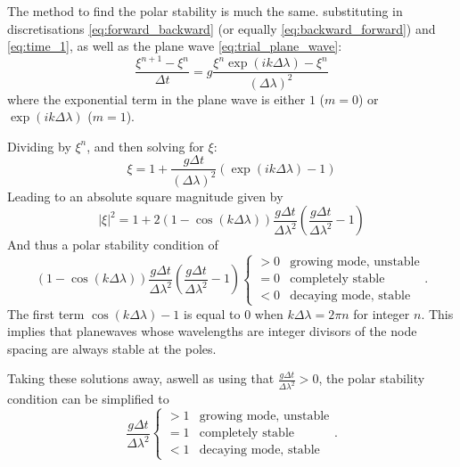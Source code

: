 \documentclass[12pt, onecolumn]{revtex4-2}    %
\begin{document}
The method to find the polar stability is much the same.
substituting in discretisations \eqref{eq:forward_backward} (or equally \eqref{eq:backward_forward}) and \eqref{eq:time_1}, as well as the plane wave \eqref{eq:trial_plane_wave}:
\begin{equation*}
    \frac{\xi^{n+1} - \xi^{n}}{\Delta t} = g\frac{\xi^n \exp(i k \Delta\lambda) - \xi^n}{(\Delta\lambda)^2}
\end{equation*}
where the exponential term in the plane wave is either $1$ ($m=0$) or $\exp(i k \Delta\lambda)$ ($m=1$).

Dividing by $\xi^n$, and then solving for $\xi$:
\begin{equation*}
    \xi = 1 + \frac{g\Delta t}{(\Delta \lambda)^2}\left(\exp(i k \Delta \lambda) - 1\right)
\end{equation*}
Leading to an absolute square magnitude given by
\begin{equation*}
    |\xi|^2 = 1 + 2 (1-\cos(k\Delta\lambda)) \frac{g \Delta t}{\Delta \lambda ^2}\left(\frac{g\Delta t}{\Delta \lambda ^2} - 1\right)
\end{equation*}
And thus a polar stability condition of
\begin{equation*}
    (1-\cos(k\Delta\lambda)) \frac{g \Delta t}{\Delta \lambda ^2}\left(\frac{g\Delta t}{\Delta \lambda ^2} - 1\right)
    \begin{cases}
        > 0 & \text{growing mode, unstable} \\
        = 0 & \text{completely stable}      \\
        < 0 & \text{decaying mode, stable}
    \end{cases}
    .
\end{equation*}
The first term $\cos(k\Delta\lambda) - 1$ is equal to $0$ when $k\Delta\lambda = 2\pi n$ for integer $n$.
This implies that planewaves whose wavelengths are integer divisors of the node spacing are always stable at the poles.

Taking these solutions away, aswell as using that $\frac{g \Delta t}{\Delta \lambda ^2} > 0$, the polar stability condition can be simplified to
\begin{equation} \label{appeq:polarstability}
    \frac{g\Delta t}{\Delta \lambda ^2}
    \begin{cases}
        > 1 & \text{growing mode, unstable} \\
        = 1 & \text{completely stable}      \\
        < 1 & \text{decaying mode, stable}
    \end{cases}
    .
\end{equation}
\end{document}

